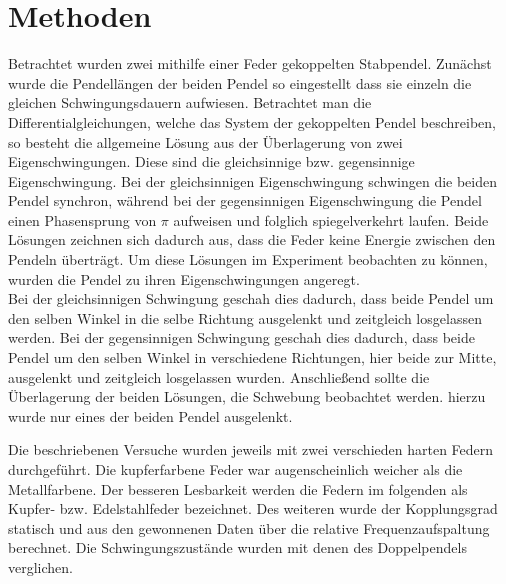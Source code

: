 \section{Methoden}
Betrachtet wurden zwei mithilfe einer Feder gekoppelten Stabpendel.
Zunächst wurde die Pendellängen der beiden Pendel so eingestellt dass sie einzeln die gleichen Schwingungsdauern aufwiesen. Betrachtet man die Differentialgleichungen, welche das System der gekoppelten Pendel beschreiben, so besteht die allgemeine Lösung aus der Überlagerung von zwei Eigenschwingungen. Diese sind die gleichsinnige bzw. gegensinnige Eigenschwingung. Bei der gleichsinnigen Eigenschwingung schwingen die beiden Pendel synchron, während bei der gegensinnigen Eigenschwingung die Pendel einen Phasensprung von $\pi$ aufweisen und folglich spiegelverkehrt laufen. Beide Lösungen zeichnen sich dadurch aus, dass die Feder keine Energie zwischen den Pendeln überträgt.
 Um diese Lösungen im Experiment beobachten zu können, wurden die Pendel zu ihren Eigenschwingungen angeregt. \\
 
 
Bei der gleichsinnigen Schwingung geschah dies dadurch, dass beide Pendel um den selben Winkel in die selbe Richtung ausgelenkt und zeitgleich losgelassen werden.
Bei der gegensinnigen Schwingung geschah dies dadurch, dass beide Pendel um den selben Winkel in verschiedene Richtungen, hier beide zur Mitte, ausgelenkt und zeitgleich losgelassen wurden.
Anschließend sollte die Überlagerung der beiden Lösungen, die Schwebung beobachtet werden. hierzu wurde nur eines der beiden Pendel ausgelenkt.
 
Die beschriebenen Versuche wurden jeweils mit zwei verschieden harten Federn durchgeführt. Die kupferfarbene Feder war augenscheinlich weicher als die Metallfarbene. Der besseren Lesbarkeit werden die Federn im folgenden als Kupfer- bzw. Edelstahlfeder bezeichnet. Des weiteren wurde der Kopplungsgrad statisch und aus den gewonnenen Daten über die relative Frequenzaufspaltung berechnet. Die Schwingungszustände wurden mit denen des Doppelpendels verglichen.

 
















